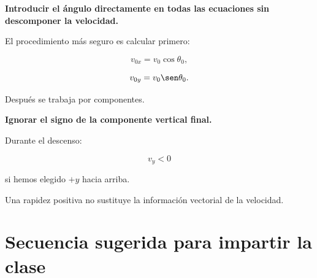 \begin{errorfrecuente}
\textbf{Introducir el ángulo directamente en todas las ecuaciones sin
descomponer la velocidad.}

El procedimiento más seguro es calcular primero:

\[
v_{0x}=v_0\cos\theta_0,
\]

\[
v_{0y}=v_0\sen\theta_0.
\]

Después se trabaja por componentes.
\end{errorfrecuente}


\begin{errorfrecuente}
\textbf{Ignorar el signo de la componente vertical final.}

Durante el descenso:

\[
v_y<0
\]

si hemos elegido \(+y\) hacia arriba.

Una rapidez positiva no sustituye la información vectorial de la velocidad.
\end{errorfrecuente}


\section{Secuencia sugerida para impartir la clase}

